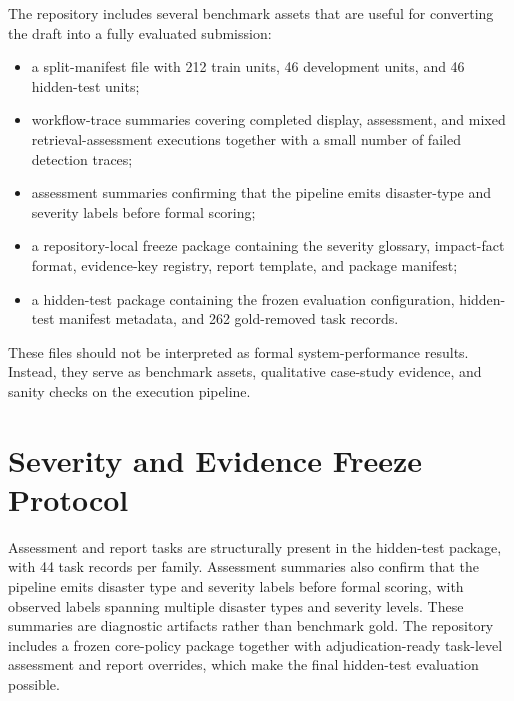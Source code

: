 \documentclass{article}
\begin{document}
The repository includes several benchmark assets that are useful for converting the draft into a fully evaluated submission:
\begin{itemize}[leftmargin=1.2em]
    \item a split-manifest file with 212 train units, 46 development units, and 46 hidden-test units;
    \item workflow-trace summaries covering completed display, assessment, and mixed retrieval-assessment executions together with a small number of failed detection traces;
    \item assessment summaries confirming that the pipeline emits disaster-type and severity labels before formal scoring;
    \item a repository-local freeze package containing the severity glossary, impact-fact format, evidence-key registry, report template, and package manifest;
    \item a hidden-test package containing the frozen evaluation configuration, hidden-test manifest metadata, and 262 gold-removed task records.
\end{itemize}

These files should not be interpreted as formal system-performance results. Instead, they serve as benchmark assets, qualitative case-study evidence, and sanity checks on the execution pipeline.

\section{Severity and Evidence Freeze Protocol}

Assessment and report tasks are structurally present in the hidden-test package, with 44 task records per family. Assessment summaries also confirm that the pipeline emits disaster type and severity labels before formal scoring, with observed labels spanning multiple disaster types and severity levels. These summaries are diagnostic artifacts rather than benchmark gold. The repository includes a frozen core-policy package together with adjudication-ready task-level assessment and report overrides, which make the final hidden-test evaluation possible.
\end{document}
